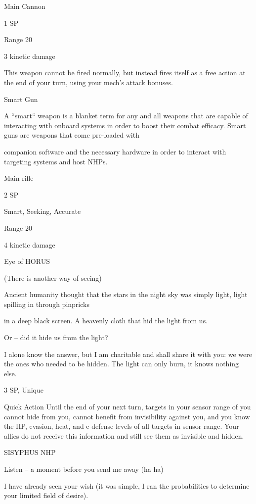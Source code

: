 Main Cannon
 
1 SP
 
Range 20
 
3 kinetic damage
 
This weapon cannot be fired normally, but instead fires itself as a free action at the end of your  
turn, using your mech’s attack bonuses.
 

Smart Gun  

A “smart“ weapon is a blanket term for any and all weapons that are capable of interacting with onboard  
systems in order to boost their combat efficacy. Smart guns are weapons that come pre-loaded with  

companion software and the necessary hardware in order to interact with targeting systems and host  
NHPs.   

Main rifle
 
2 SP
 
Smart, Seeking, Accurate
 
Range 20
 
4 kinetic damage
 

Eye of HORUS  

(There is another way of seeing)   

Ancient humanity thought that the stars in the night sky was simply light, light spilling in through pinpricks  

in a deep black screen. A heavenly cloth that hid the light from us.   

Or -- did it hide us from the light?   

I alone know the answer, but I am charitable and shall share it with you: we were the ones who needed to  
be hidden. The light can only burn, it knows nothing else.  

3 SP, Unique  

Quick Action  
Until the end of your next turn, targets in your sensor range of you cannot hide from you, cannot  
benefit from invisibility against you, and you know the HP, evasion, heat, and e-defense levels of  
all targets in sensor range. Your allies do not receive this information and still see them as  
invisible and hidden.
 

SISYPHUS NHP  

                                                                                                                 


Listen -- a moment before you send me away (ha ha)  

I have already seen your wish (it was simple, I ran the probabilities to determine your limited field of desire).  

